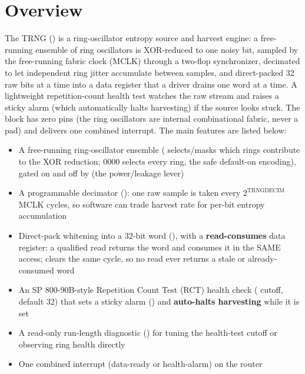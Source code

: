 \section{Overview}

The TRNG () is a ring-oscillator entropy source and harvest engine: a free-running ensemble of ring oscillators is XOR-reduced to one noisy bit, sampled by the free-running fabric clock (MCLK) through a two-flop synchronizer, decimated to let independent ring jitter accumulate between samples, and direct-packed 32 raw bits at a time into a data register that a driver drains one word at a time. A lightweight repetition-count health test watches the raw stream and raises a sticky alarm (which automatically halts harvesting) if the source looks stuck. The block has zero pins (the ring oscillators are internal combinational fabric, never a pad) and delivers one combined interrupt. The main features are listed below:

\begin{itemize}
	\item A free-running ring-oscillator ensemble ( selects/masks which rings contribute to the XOR reduction; 0000 selects every ring, the safe default-on encoding), gated on and off by  (the power/leakage lever)
	\item A programmable decimator (): one raw sample is taken every $2^{\mathrm{TRNGDECIM}}$ MCLK cycles, so software can trade harvest rate for per-bit entropy accumulation
	\item Direct-pack whitening into a 32-bit word (), with a \textbf{read-consumes} data register: a qualified read returns the word and consumes it in the SAME access;  clears the same cycle, so no read ever returns a stale or already-consumed word
	\item An SP 800-90B-style Repetition Count Test (RCT) health check ( cutoff, default 32) that sets a sticky alarm () and \textbf{auto-halts harvesting} while it is set
	\item A read-only run-length diagnostic () for tuning the health-test cutoff or observing ring health directly
	\item One combined interrupt (data-ready or health-alarm) on the router
\end{itemize}

